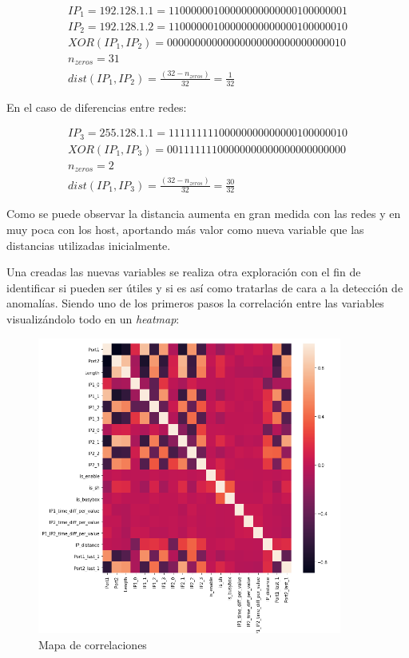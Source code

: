 \begin{gather*}
IP_1 = 192.128.1.1 = 11000000100000000000000100000001 \\
IP_2 = 192.128.1.2 = 11000000100000000000000100000010 \\
XOR(IP_1, IP_2) = 00000000000000000000000000000010 \\
n_{zeros} = 31 \\
dist(IP_1, IP_2) = \frac{(32 - n_{zeros})}{32} = \frac{1}{32}
\end{gather*}

En el caso de diferencias entre redes:

\begin{gather*}
    IP_3 = 255.128.1.1 = 11111111100000000000000100000010 \\
    XOR(IP_1, IP_3) = 00111111100000000000000000000000 \\
    n_{zeros} = 2 \\
    dist(IP_1, IP_3) = \frac{(32 - n_{zeros})}{32} = \frac{30}{32}
\end{gather*}

Como se puede observar la distancia aumenta en gran medida con las redes y en muy poca con los host, aportando más valor como nueva variable que las distancias utilizadas inicialmente.

Una creadas las nuevas variables se realiza otra exploración con el fin de identificar si pueden ser útiles y si es así como tratarlas de cara a la detección de anomalías. Siendo uno de los primeros pasos la correlación entre las variables visualizándolo todo en un \textit{heatmap}:

\begin{figure}[H]
    \centering
    \includegraphics[width=10cm]{figs/corr.PNG}
    \caption{Mapa de correlaciones}
    \label{fig:corr}
\end{figure}

